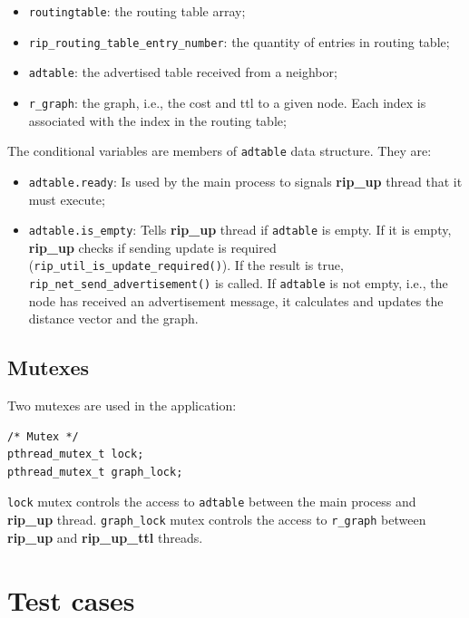 \documentclass[10pt]{extarticle}
\begin{document}
\begin{itemize}
\item{\texttt{routingtable}:} the routing table array;
\item{\texttt{rip\_routing\_table\_entry\_number}:} the quantity of entries in
  routing table;
\item{\texttt{adtable}:} the advertised table received from a neighbor;
\item{\texttt{r\_graph}:} the graph, i.e., the cost and ttl to a given
  node. Each index is associated with the index in the routing table;
\end{itemize}

The conditional variables are members of \texttt{adtable} data structure. They are:

\begin{itemize}
\item{\texttt{adtable.ready}:} Is used by the main process to signals
  \textbf{rip\_up} thread that it must execute;
\item{\texttt{adtable.is\_empty}:} Tells \textbf{rip\_up} thread if
  \texttt{adtable} is empty. If it is empty, \textbf{rip\_up} checks if sending update
is required (\texttt{rip\_util\_is\_update\_required()}). If the result is true, 
\texttt{rip\_net\_send\_advertisement()} is called. If \texttt{adtable} is not
empty,
i.e., the node has received an advertisement message, it calculates and updates
the distance vector and the graph.
\end{itemize}

\subsection{Mutexes}

Two mutexes are used in the application:

\begin{lstlisting}
/* Mutex */
pthread_mutex_t lock;
pthread_mutex_t graph_lock;
\end{lstlisting}

\texttt{lock} mutex controls the access to \texttt{adtable} between the main
process and \textbf{rip\_up} thread. \texttt{graph\_lock} mutex controls the
access to \texttt{r\_graph} between \textbf{rip\_up} and \textbf{rip\_up\_ttl}
threads.

\section{Test cases}
\end{document}
